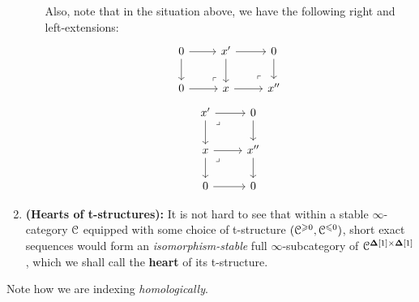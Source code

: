 \begin{definition}[t-structures]
\begin{enumerate}
\begin{enumerate}
                            Also, note that in the situation above, we have the following right and left-extensions:
                                $$
                                    \begin{tikzcd}
                                    	0 & {x'} & 0 \\
                                    	0 & x & {x''}
                                    	\arrow[from=1-3, to=2-3]
                                    	\arrow[from=2-2, to=2-3]
                                    	\arrow[from=1-2, to=2-2]
                                    	\arrow[from=1-2, to=1-3]
                                    	\arrow["\lrcorner"{anchor=center, pos=0.125, rotate=180}, draw=none, from=2-3, to=1-2]
                                    	\arrow[from=1-1, to=2-1]
                                    	\arrow[from=2-1, to=2-2]
                                    	\arrow[from=1-1, to=1-2]
                                    	\arrow["\lrcorner"{anchor=center, pos=0.125, rotate=180}, draw=none, from=2-2, to=1-1]
                                    \end{tikzcd}
                                $$
                                $$
                                    \begin{tikzcd}
                                    	{x'} & 0 \\
                                    	x & {x''} \\
                                    	0 & 0
                                    	\arrow[from=1-2, to=2-2]
                                    	\arrow[from=2-1, to=2-2]
                                    	\arrow[from=1-1, to=2-1]
                                    	\arrow[from=1-1, to=1-2]
                                    	\arrow["\lrcorner"{anchor=center, pos=0.125}, draw=none, from=1-1, to=2-2]
                                    	\arrow[from=2-2, to=3-2]
                                    	\arrow[from=2-1, to=3-1]
                                    	\arrow[from=3-1, to=3-2]
                                    	\arrow["\lrcorner"{anchor=center, pos=0.125}, draw=none, from=2-1, to=3-2]
                                    \end{tikzcd}
                                $$
                        \end{enumerate}
                    \item \textbf{(Hearts of t-structures):} It is not hard to see that within a stable $\infty$-category $\mathcal{C}$ equipped with some choice of t-structure $(\mathcal{C}^{\geqslant 0}, \mathcal{C}^{\leqslant 0})$, short exact sequences would form an \textit{isomorphism-stable} full $\infty$-subcategory of $\C^{\simp[1] \x \simp[1]}$, which we shall call the \textbf{heart} of its t-structure. 
                \end{enumerate}
                Note how we are indexing \textit{homologically}.
            \end{definition}
